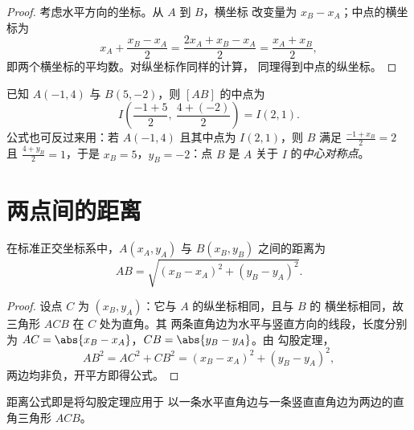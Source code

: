\begin{proof}
考虑水平方向的坐标。从 $A$ 到 $B$，横坐标
改变量为 $x_B - x_A$；中点的横坐标为
\[
x_A + \frac{x_B - x_A}{2} = \frac{2x_A + x_B - x_A}{2}
= \frac{x_A + x_B}{2},
\]
即两个横坐标的平均数。对纵坐标作同样的计算，
同理得到中点的纵坐标。
\end{proof}

\begin{example}\label{ex:g10:coordgeom:midpoint}
已知 $A(-1, 4)$ 与 $B(5, -2)$，则 $[AB]$ 的中点为
\[
I\left(\frac{-1 + 5}{2},\ \frac{4 + (-2)}{2}\right) = I(2, 1).
\]
公式也可反过来用：若 $A(-1, 4)$ 且其中点为
$I(2, 1)$，则 $B$ 满足 $\frac{-1 + x_B}{2} = 2$ 且
$\frac{4 + y_B}{2} = 1$，于是 $x_B = 5$，$y_B = -2$：点 $B$ 是
$A$ 关于 $I$ 的\emph{中心对称点}。
\end{example}

\section{两点间的距离}

\begin{theorem}[距离公式]\label{thm:g10:coordgeom:distance}
在标准正交坐标系中，$A(x_A, y_A)$ 与
$B(x_B, y_B)$ 之间的距离为
\[
AB = \sqrt{(x_B - x_A)^2 + (y_B - y_A)^2}.
\]
\end{theorem}

\begin{proof}
设点 $C$ 为 $(x_B, y_A)$：它与 $A$ 的纵坐标相同，且与 $B$ 的
横坐标相同，故三角形 $ACB$ 在 $C$ 处为直角。其
两条直角边为水平与竖直方向的线段，长度分别为
$AC = \abs{x_B - x_A}$，$CB = \abs{y_B - y_A}$。由
勾股定理，
\[
AB^2 = AC^2 + CB^2 = (x_B - x_A)^2 + (y_B - y_A)^2,
\]
两边均非负，开平方即得公式。
\end{proof}

\begin{omfigure}

{\small 距离公式即是将勾股定理应用于
以一条水平直角边与一条竖直直角边为两边的直角三角形 $ACB$。}
\end{omfigure}

